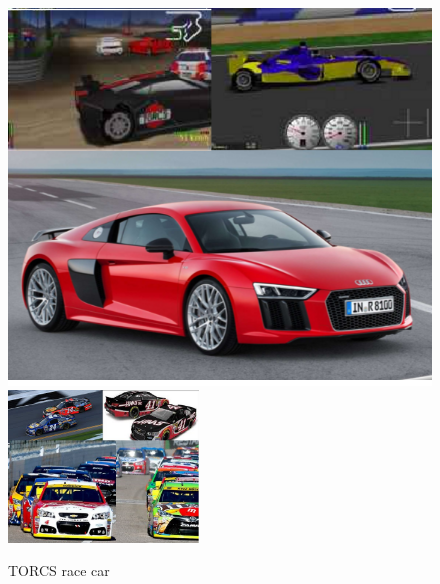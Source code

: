 \documentclass{llncs}
\begin{document}
\begin{figure}[h!]
	\centering
	\label{voiture}
	\includegraphics[width=0.4
	\textwidth]{fig/voiture.PNG}
	\includegraphics[width=0.45\textwidth]{fig/NASCAR.PNG}
	\begin{minipage}{10cm}
		\centering
		
		\caption{\footnotesize TORCS race car}
		
	\end{minipage} 
\end{figure}
\end{document}
